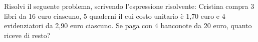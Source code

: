 \item Risolvi il seguente problema, scrivendo l'espressione risolvente: Cristina compra 3 libri da 16 euro ciascuno, 5 quaderni il cui costo unitario è 1,70 euro e 4 evidenziatori da 2,90 euro ciascuno. Se paga con 4 banconote da 20 euro, quanto riceve di resto?